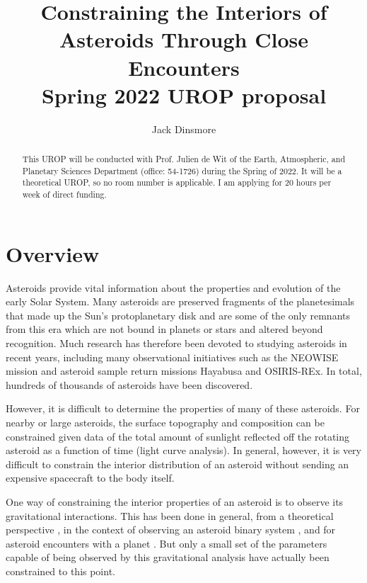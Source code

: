 \documentclass[11pt]{article}
\title{Constraining the Interiors of Asteroids Through Close Encounters\\ 
{\Large Spring 2022 UROP proposal}}
\author{Jack Dinsmore}
\begin{document}
\maketitle

\begin{abstract}
  This UROP will be conducted with Prof. Julien de Wit of the Earth, Atmospheric, and Planetary Sciences Department (office: 54-1726) during the Spring of 2022. It will be a theoretical UROP, so no room number is applicable. I am applying for 20 hours per week of direct funding.
\end{abstract}

\section{Overview}
Asteroids provide vital information about the properties and evolution of the early Solar System. Many asteroids are preserved fragments of the planetesimals that made up the Sun's protoplanetary disk and are some of the only remnants from this era which are not bound in planets or stars and altered beyond recognition. Much research has therefore been devoted to studying asteroids in recent years, including many observational initiatives such as the NEOWISE mission and asteroid sample return missions Hayabusa and OSIRIS-REx. In total, hundreds of thousands of asteroids have been discovered.

However, it is difficult to determine the properties of many of these asteroids. For nearby or large asteroids, the surface topography and composition can be constrained given data of the total amount of sunlight reflected off the rotating asteroid as a function of time (light curve analysis). In general, however, it is very difficult to constrain the interior distribution of an asteroid without sending an expensive spacecraft to the body itself.

One way of constraining the interior properties of an asteroid is to observe its gravitational interactions. This has been done in general, from a theoretical perspective \cite{ashenberg07, paul88, BOUE2009750}, in the context of observing an asteroid binary system \cite{Naidu_2015, DESCAMPS2020113726}, and for asteroid encounters with a planet \cite{BENSON2020113518, MOSKOVITZ2020113519, SCHEERES2005281}. But only a small set of the parameters capable of being observed by this gravitational analysis have actually been constrained to this point.
\end{document}
